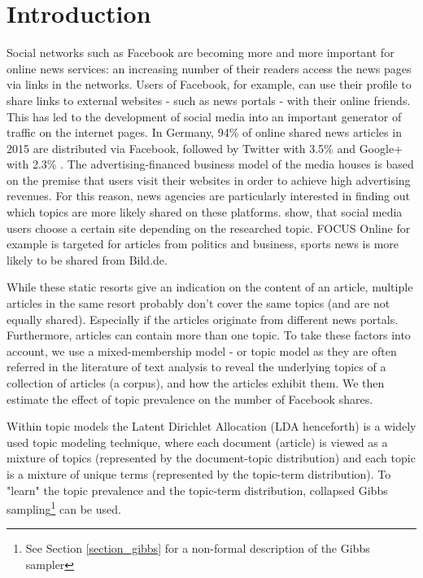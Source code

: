 \documentclass[12pt,a4paper,notitlepage]{article}
\begin{document}
\section{Introduction}

Social networks such as Facebook are becoming more and more important for online news services: an increasing number of their readers access the news pages via links in the networks. Users of Facebook, for example, can use their profile to share links to external websites - such as news portals - with their online friends. This has led to the development of social media into an important generator of traffic on the internet pages. In Germany, 94\% of online shared news articles in 2015 are distributed via Facebook, followed by Twitter with 3.5\% and Google+ with 2.3\% \citep{schiller_development_2016}. The advertising-financed business model of the media houses is based on the premise that users visit their websites in order to achieve high advertising revenues. For this reason, news agencies are particularly interested in finding out which topics are more likely shared on these platforms. \citet{schiller_development_2016} show, that social media users choose a certain site depending on the researched topic. FOCUS Online for example is targeted for articles from politics and business, sports news is more likely to be shared from Bild.de. 

While these static resorts give an indication on the content of an article, multiple articles in the same resort probably don't cover the same topics (and are not equally shared). Especially if the articles originate from different news portals. Furthermore, articles can contain more than one topic. To take these factors into account, we use a mixed-membership model \citep{airoldi_handbook_2014} - or topic model as they are often referred in the literature of text analysis \citep{blei_probabilistic_2012} to reveal the underlying topics of a collection of articles (a corpus), and how the articles exhibit them. We then estimate the effect of topic prevalence on the number of Facebook shares. 

Within topic models the Latent Dirichlet Allocation (LDA henceforth) is a widely used topic modeling technique, where each document (article) is viewed as a mixture of topics (represented by the document-topic distribution) and each topic is a mixture of unique terms (represented by the topic-term distribution). To "learn" the topic prevalence and the topic-term distribution, collapsed Gibbs sampling\footnote{See Section \ref{section_gibbs} for a non-formal description of the Gibbs sampler} can be used. 
\end{document}
